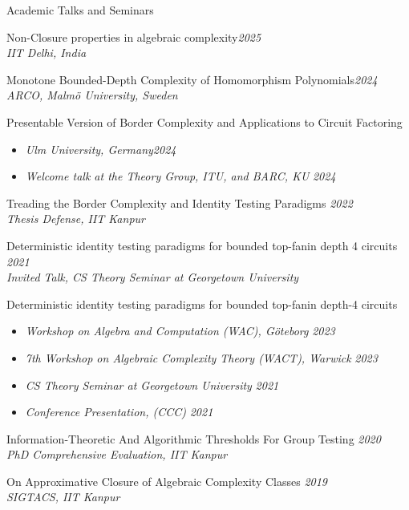 \documentclass{resume} %
\begin{document}
\begin{rSection}{Academic Talks and Seminars}
    \item {Non-Closure properties in algebraic complexity}\hfill {\em 2025}\\
    {\em IIT Delhi, India}

    \item {Monotone Bounded-Depth Complexity of Homomorphism Polynomials}\hfill {\em 2024}\\
    {\em ARCO, Malm\"{o} University, Sweden}

    \item {Presentable Version of Border Complexity and Applications to Circuit Factoring}
    \begin{itemize}
      \item {\em Ulm University, Germany}\hfill {\em 2024}
      \item {\em Welcome talk at the Theory Group, ITU, and BARC, KU} \hfill {\em 2024}
    \end{itemize}

    \item Treading the Border Complexity and Identity Testing Paradigms \hfill {\em 2022}
    \\ {\em Thesis Defense, IIT Kanpur}
    
    \item Deterministic identity testing paradigms for bounded top-fanin depth 4 circuits \hfill {\em 2021}
    \\ {\em Invited Talk, CS Theory Seminar at Georgetown University}
    
    \item Deterministic identity testing paradigms for bounded top-fanin depth-4 circuits
    \begin{itemize}
      \item {\em Workshop on Algebra and Computation (WAC), G\"oteborg} \hfill {\em 2023}
      \item {\em 7th Workshop on Algebraic Complexity Theory (WACT), Warwick} \hfill {\em 2023}
      \item {\em CS Theory Seminar at Georgetown University} \hfill {\em 2021}
      \item {\em Conference Presentation, (CCC)} \hfill {\em 2021}
    \end{itemize}
    
    \item Information-Theoretic And Algorithmic Thresholds For Group Testing \hfill {\em 2020}
    \\ {\em PhD Comprehensive Evaluation, IIT Kanpur}
    
    \item On Approximative Closure of Algebraic Complexity Classes \hfill {\em 2019}
    \\ {\em SIGTACS, IIT Kanpur}
\end{rSection}
\end{document}
